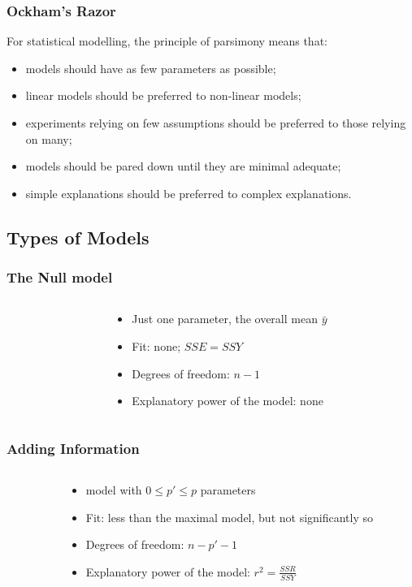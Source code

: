 \documentclass[xcolor={table},handout]{beamer}
\begin{document}
\begin{frame}\frametitle{Ockham's Razor}

For statistical modelling, the principle of
parsimony means that:
\begin{itemize}
\item models should have as few parameters as possible;
\item linear models should be preferred to non-linear models;
\item experiments relying on few assumptions should be preferred to those relying on many;
\item models should be pared down until they are minimal adequate;
\item simple explanations should be preferred to complex explanations.
\end{itemize}
\end{frame}

\subsection{Types of Models}

\begin{frame}\frametitle{The Null model}
\begin{columns}
\begin{column}{0.6\textwidth}
\end{column}
\begin{column}{0.4\textwidth}
\begin{itemize}
\item Just one parameter, the overall mean $\bar{y}$
\item Fit: none; $SSE = SSY$
\item Degrees of freedom: $n-1$
\item Explanatory power of the model: none
\end{itemize}
\end{column}
\end{columns}
\end{frame}

\begin{frame}\frametitle{Adding Information}
\begin{columns}
\begin{column}{0.6\textwidth}
\end{column}
\begin{column}{0.4\textwidth}
\begin{itemize}
\item model with $0 \le p' \le p$ parameters
\item Fit: less than the maximal model, but not significantly so
\item Degrees of freedom: $n-p'-1$
\item Explanatory power of the model: $r^2 = \frac{SSR}{SSY}$    
\end{itemize}
\end{column}
\end{columns}
\end{frame}
\end{document}

